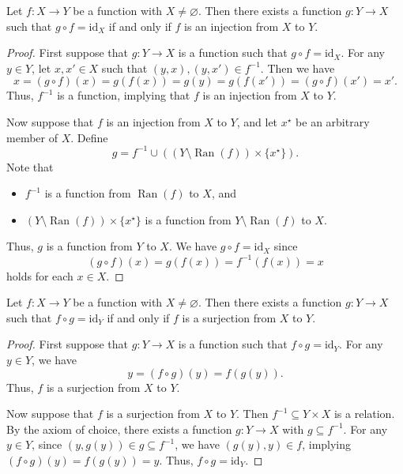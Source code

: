 \documentclass[11pt]{article}
\DeclareMathOperator{\ran}{Ran}
\newcommand{\id}{\mathrm{id}}
\begin{document}
\begin{theorem}
  Let $f: X \to Y$ be a function with $X \neq \varnothing$.
  Then there exists a function $g: Y \to X$ such that $g \circ f = \id_X$ if and only if $f$ is an injection from $X$ to $Y$.
\end{theorem}
\begin{proof}
  First suppose that $g: Y \to X$ is a function such that $g \circ f = \id_X$.
  For any $y \in Y$, let $x, x' \in X$ such that $(y, x), (y, x') \in f^{-1}$.
  Then we have
  \begin{equation*}
    x = (g \circ f)(x) = g(f(x)) = g(y) = g(f(x')) = (g \circ f)(x') = x'.
  \end{equation*}
  Thus, $f^{-1}$ is a function, implying that $f$ is an injection from $X$ to $Y$.
  \par Now suppose that $f$ is an injection from $X$ to $Y$, and let $x^\star$ be an arbitrary member of $X$.
  Define
  \begin{equation*}
    g = f^{-1} \cup ((Y \setminus \ran(f)) \times \{x^\star\}).
  \end{equation*}
  Note that
  \begin{itemize}
    \item $f^{-1}$ is a function from $\ran(f)$ to $X$, and
    \item $(Y \setminus \ran(f)) \times \{x^\star\}$ is a function from $Y \setminus \ran(f)$ to $X$.
  \end{itemize}
  Thus, $g$ is a function from $Y$ to $X$.
  We have $g \circ f = \id_X$ since
  \begin{equation*}
    (g \circ f)(x) = g(f(x)) = f^{-1}(f(x)) = x
  \end{equation*}
  holds for each $x \in X$.
\end{proof}

\begin{theorem}
  Let $f: X \to Y$ be a function with $X \neq \varnothing$.
  Then there exists a function $g: Y \to X$ such that $f \circ g = \id_Y$ if and only if $f$ is a surjection from $X$ to $Y$.
\end{theorem}
\begin{proof}
  First suppose that $g: Y \to X$ is a function such that $f \circ g = \id_Y$.
  For any $y \in Y$, we have
  \begin{equation*}
    y = (f \circ g)(y) = f(g(y)).
  \end{equation*}
  Thus, $f$ is a surjection from $X$ to $Y$.
  \par Now suppose that $f$ is a surjection from $X$ to $Y$.
  Then $f^{-1} \subseteq Y \times X$ is a relation.
  By the axiom of choice, there exists a function $g: Y \to X$ with $g \subseteq f^{-1}$.
  For any $y \in Y$, since $(y, g(y)) \in g \subseteq f^{-1}$, we have $(g(y), y) \in f$, implying $(f \circ g)(y) = f(g(y)) = y$.
  Thus, $f \circ g = \id_Y$.
\end{proof}
\end{document}
